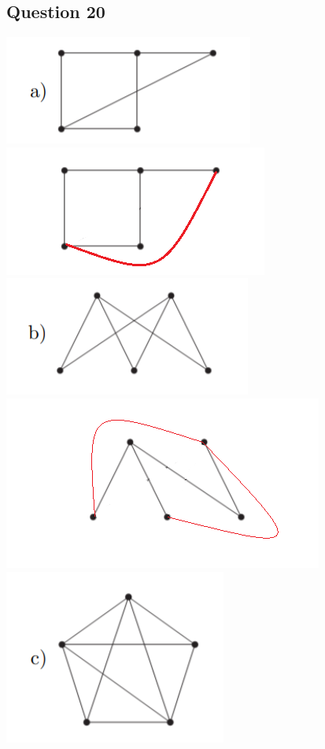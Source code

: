 \documentclass{article}
\begin{document}
\subsection*{Question 20}
\includegraphics[]{Question 20/connectivity_20.a.png}
\includegraphics[]{Question 20/connectivity_20.a.edited.png}
\newline
\includegraphics[]{Question 20/connectivity_20.b.png}
\includegraphics[]{Question 20/connectivity_20.b.edited.png}
\newline
\includegraphics[]{Question 20/connectivity_20.c.png}
\end{document}
